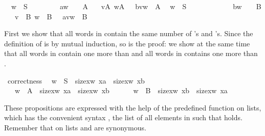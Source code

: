 \begin{isabellebody}
\isanewline
\ \ {\isachardoublequoteopen}w\ {\isasymin}\ S\ \ \ \ \ \ \ \ {\isasymLongrightarrow}\ a{\isacharhash}w\ \ \ {\isasymin}\ A{\isachardoublequoteclose}\isanewline
\ \ {\isachardoublequoteopen}{\isasymlbrakk}\ v{\isasymin}A{\isacharsemicolon}\ w{\isasymin}A\ {\isasymrbrakk}\ {\isasymLongrightarrow}\ b{\isacharhash}v{\isacharat}w\ {\isasymin}\ A{\isachardoublequoteclose}\isanewline
\isanewline
\ \ {\isachardoublequoteopen}w\ {\isasymin}\ S\ \ \ \ \ \ \ \ \ \ \ \ {\isasymLongrightarrow}\ b{\isacharhash}w\ \ \ {\isasymin}\ B{\isachardoublequoteclose}\isanewline
\ \ {\isachardoublequoteopen}{\isasymlbrakk}\ v\ {\isasymin}\ B{\isacharsemicolon}\ w\ {\isasymin}\ B\ {\isasymrbrakk}\ {\isasymLongrightarrow}\ a{\isacharhash}v{\isacharat}w\ {\isasymin}\ B{\isachardoublequoteclose}%
\begin{isamarkuptext}%
\noindent
First we show that all words in  contain the same number of 's and 's. Since the definition of  is by mutual
induction, so is the proof: we show at the same time that all words in
 contain one more  than  and all words in  contains one more  than .%
\end{isamarkuptext}%
\isamarkuptrue%
\isamarkupfalse%
\ correctness{\isacharcolon}\isanewline
\ \ {\isachardoublequoteopen}{\isacharparenleft}w\ {\isasymin}\ S\ {\isasymlongrightarrow}\ size{\isacharbrackleft}x{\isasymin}w{\isachardot}\ x{\isacharequal}a{\isacharbrackright}\ {\isacharequal}\ size{\isacharbrackleft}x{\isasymin}w{\isachardot}\ x{\isacharequal}b{\isacharbrackright}{\isacharparenright}\ \ \ \ \ {\isasymand}\isanewline
\ \ \ {\isacharparenleft}w\ {\isasymin}\ A\ {\isasymlongrightarrow}\ size{\isacharbrackleft}x{\isasymin}w{\isachardot}\ x{\isacharequal}a{\isacharbrackright}\ {\isacharequal}\ size{\isacharbrackleft}x{\isasymin}w{\isachardot}\ x{\isacharequal}b{\isacharbrackright}\ {\isacharplus}\ {}{\isacharparenright}\ {\isasymand}\isanewline
\ \ \ {\isacharparenleft}w\ {\isasymin}\ B\ {\isasymlongrightarrow}\ size{\isacharbrackleft}x{\isasymin}w{\isachardot}\ x{\isacharequal}b{\isacharbrackright}\ {\isacharequal}\ size{\isacharbrackleft}x{\isasymin}w{\isachardot}\ x{\isacharequal}a{\isacharbrackright}\ {\isacharplus}\ {}{\isacharparenright}{\isachardoublequoteclose}%
\isadelimproof
%
\endisadelimproof
%
\isatagproof
%
\begin{isamarkuptxt}%
\noindent
These propositions are expressed with the help of the predefined  function on lists, which has the convenient syntax , the list of all elements  in  such that 
holds. Remember that on lists  and  are synonymous.


\end{isamarkuptxt}
\end{isabellebody}
